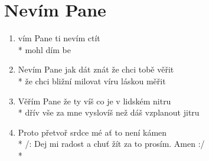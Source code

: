 \section{Nevím Pane}
\begin{enumerate}
\item {}vím Pane ti  nevím  ctít  \\*
 mohl    dím be 
\item Nevím Pane jak dát znát že chci tobě věřit \\*
že chci bližní milovat víru láskou měřit 
\item Věřím Pane že ty víš co je v lidském nitru \\*
dřív vše za mne vyslovíš než dáš vzplanout jitru 
\item Proto přetvoř srdce mé ať to není kámen \\*
/: Dej mi radost a chuť žít za to prosím. Amen :/ \\*
\end{enumerate}
